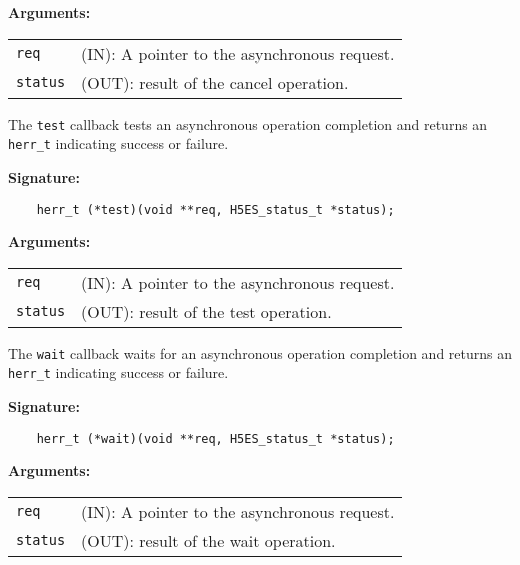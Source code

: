 \textbf{Arguments:}\\
\begin{tabular}{l p{10cm}}
  {\tt req} & (IN): A pointer to the asynchronous request.\\
  {\tt status} & (OUT): result of the cancel operation.\\
\end{tabular}

The {\tt test} callback tests an asynchronous operation completion
and returns an {\tt herr\_t} indicating success or failure.

\textbf{Signature:}
\begin{lstlisting}
    herr_t (*test)(void **req, H5ES_status_t *status);
\end{lstlisting}

\textbf{Arguments:}\\
\begin{tabular}{l p{10cm}}
  {\tt req} & (IN): A pointer to the asynchronous request.\\
  {\tt status} & (OUT): result of the test operation.\\
\end{tabular}

The {\tt wait} callback waits for an asynchronous operation completion
and returns an {\tt herr\_t} indicating success or failure.

\textbf{Signature:}
\begin{lstlisting}
    herr_t (*wait)(void **req, H5ES_status_t *status);
\end{lstlisting}

\textbf{Arguments:}\\
\begin{tabular}{l p{10cm}}
  {\tt req} & (IN): A pointer to the asynchronous request.\\
  {\tt status} & (OUT): result of the wait operation.\\
\end{tabular}

